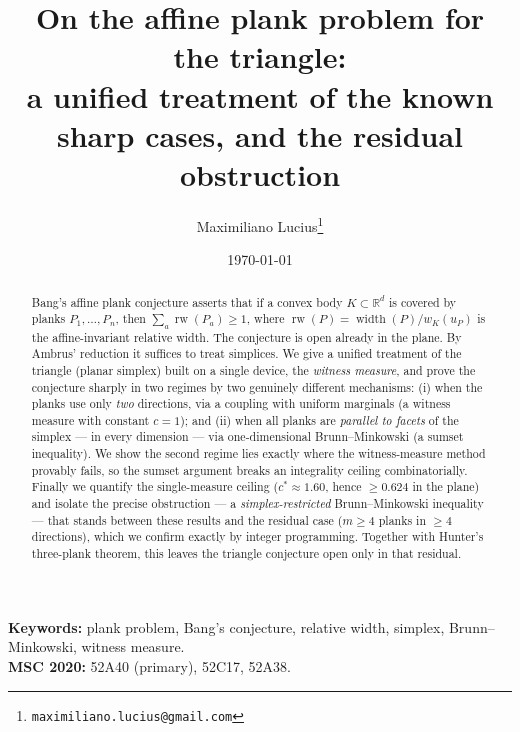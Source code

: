 \documentclass[11pt]{article}
\title{On the affine plank problem for the triangle:\\
a unified treatment of the known sharp cases, and the residual obstruction}
\author{Maximiliano Lucius\thanks{\texttt{maximiliano.lucius@gmail.com}}}
\date{\today}
\theoremstyle{plain}
\theoremstyle{remark}
\newcommand{\rw}{\operatorname{rw}}
\newcommand{\R}{\mathbb{R}}
\begin{document}
\maketitle

\begin{abstract}
Bang's affine plank conjecture asserts that if a convex body $K\subset\R^d$ is
covered by planks $P_1,\dots,P_n$, then $\sum_a \rw(P_a)\ge 1$, where
$\rw(P)=\operatorname{width}(P)/w_K(u_P)$ is the affine-invariant relative width.
The conjecture is open already in the plane. By Ambrus' reduction it suffices to
treat simplices. We give a unified treatment of the triangle (planar simplex)
built on a single device, the \emph{witness measure}, and prove the conjecture
sharply in two regimes by two genuinely different mechanisms:
(i) when the planks use only \emph{two} directions, via a coupling with uniform
marginals (a witness measure with constant $c=1$); and
(ii) when all planks are \emph{parallel to facets} of the simplex --- in every
dimension --- via one-dimensional Brunn--Minkowski (a sumset inequality).
We show the second regime lies exactly where the witness-measure method provably
fails, so the sumset argument breaks an integrality ceiling combinatorially.
Finally we quantify the single-measure ceiling ($c^\ast\approx1.60$, hence
$\ge0.624$ in the plane) and isolate the precise obstruction --- a
\emph{simplex-restricted} Brunn--Minkowski inequality --- that stands between
these results and the residual case ($m\ge4$ planks in $\ge4$ directions), which
we confirm exactly by integer programming. Together with Hunter's three-plank
theorem, this leaves the triangle conjecture open only in that residual.
\end{abstract}

\noindent\textbf{Keywords:} plank problem, Bang's conjecture, relative width,
simplex, Brunn--Minkowski, witness measure.\\
\textbf{MSC 2020:} 52A40 (primary), 52C17, 52A38.
\end{document}
